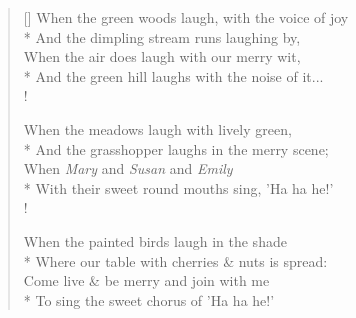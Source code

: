 \documentclass[MAIN]{subfiles}
\begin{document}
\settowidth{\versewidth}{And the green hill laughs with the noise of it;}
\begin{verse}[\versewidth]
When the green woods laugh, with the voice of joy\\*
And the dimpling stream runs laughing by,\\
When the air does laugh with our merry wit,\\*
And the green hill laughs with the noise of it...\\!

When the meadows laugh with lively green,\\*
And the grasshopper laughs in the merry scene;\\
When \emph{Mary} and \emph{Susan} and \emph{Emily}\\*
With their sweet round mouths sing, 'Ha ha he!'\\!

When the painted birds laugh in the shade\\*
Where our table with cherries \& nuts is spread:\\
Come live \& be merry and join with me\\*
To sing the sweet chorus of 'Ha ha he!'
\end{verse}
\end{document}
